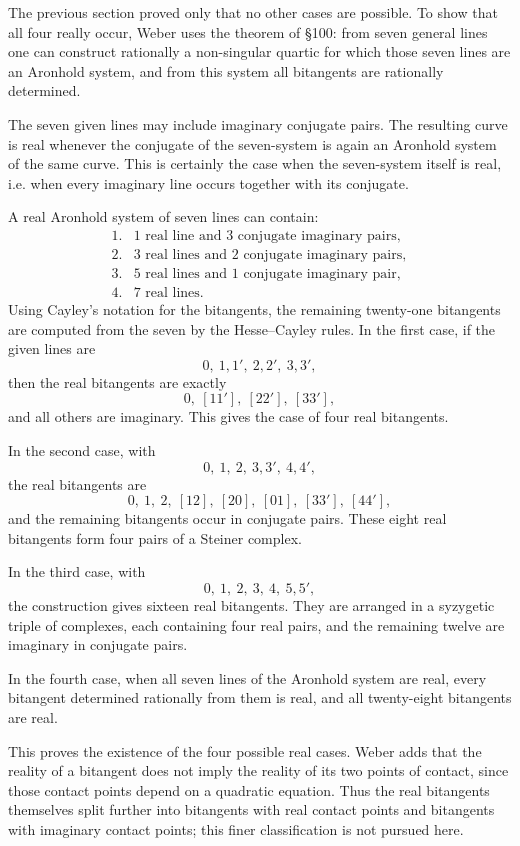 \documentclass[12pt,a4paper]{article}
\begin{document}
The previous section proved only that no other cases are possible.  To show that all four really occur, Weber uses the theorem of §100: from seven general lines one can construct rationally a non-singular quartic for which those seven lines are an Aronhold system, and from this system all bitangents are rationally determined.

The seven given lines may include imaginary conjugate pairs.  The resulting curve is real whenever the conjugate of the seven-system is again an Aronhold system of the same curve.  This is certainly the case when the seven-system itself is real, i.e. when every imaginary line occurs together with its conjugate.

A real Aronhold system of seven lines can contain:
\[
\begin{array}{ll}
1.&1\text{ real line and }3\text{ conjugate imaginary pairs},\\
2.&3\text{ real lines and }2\text{ conjugate imaginary pairs},\\
3.&5\text{ real lines and }1\text{ conjugate imaginary pair},\\
4.&7\text{ real lines}.
\end{array}
\]
Using Cayley's notation for the bitangents, the remaining twenty-one bitangents are computed from the seven by the Hesse--Cayley rules.  In the first case, if the given lines are
\[
0,\ 1,1',\ 2,2',\ 3,3',
\]
then the real bitangents are exactly
\[
0,\ [11'],\ [22'],\ [33'],
\]
and all others are imaginary.  This gives the case of four real bitangents.

In the second case, with
\[
0,\ 1,\ 2,\ 3,3',\ 4,4',
\]
the real bitangents are
\[
0,\ 1,\ 2,\ [12],\ [20],\ [01],\ [33'],\ [44'],
\]
and the remaining bitangents occur in conjugate pairs.  These eight real bitangents form four pairs of a Steiner complex.

In the third case, with
\[
0,\ 1,\ 2,\ 3,\ 4,\ 5,5',
\]
the construction gives sixteen real bitangents.  They are arranged in a syzygetic triple of complexes, each containing four real pairs, and the remaining twelve are imaginary in conjugate pairs.

In the fourth case, when all seven lines of the Aronhold system are real, every bitangent determined rationally from them is real, and all twenty-eight bitangents are real.

This proves the existence of the four possible real cases.  Weber adds that the reality of a bitangent does not imply the reality of its two points of contact, since those contact points depend on a quadratic equation.  Thus the real bitangents themselves split further into bitangents with real contact points and bitangents with imaginary contact points; this finer classification is not pursued here.
\end{document}
